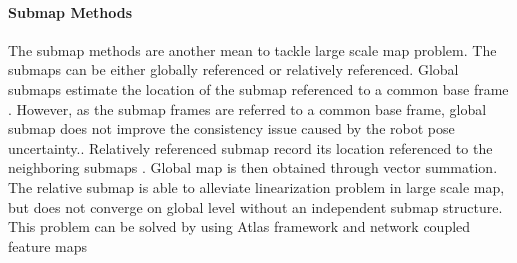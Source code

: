 \paragraph{Submap Methods}The submap methods are another mean to
tackle large scale map problem. The submaps can be either globally
referenced or relatively referenced. Global submaps estimate the
location of the submap referenced to a common base frame
\cite{estrada_hierarchical_2005} \cite{leonard_consistent_2003}.
However, as the submap frames are referred to a common base frame,
global submap does not improve the consistency issue caused by the
robot pose uncertainty.\cite{bailey_simultaneous_2006}. Relatively
referenced submap record its location referenced to the neighboring
submaps \cite{chong_feature-based_1999}
\cite{williams_efficient_2001}. Global map is then obtained through
vector summation. The relative submap is able to alleviate
linearization problem in large scale map, but does
not converge on global level without an independent submap structure.
This problem can be solved by using Atlas framework and network
coupled feature maps \cite{bosse_slam_2004} \cite{bailey_mobile_2002}





